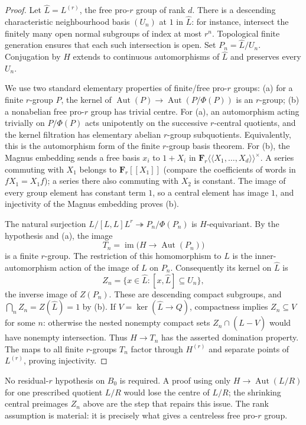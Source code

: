 \begin{proof}
Let $\widehat L=L^{(r)}$, the free pro-$r$ group of rank $d$.
There is a descending characteristic neighbourhood basis $(U_n)$ at $1$
in $\widehat L$: for instance, intersect the finitely many open normal
subgroups of index at most $r^n$. Topological finite generation ensures
that each such intersection is open. Set $P_n=\widehat L/U_n$.
Conjugation by $H$ extends to continuous automorphisms of $\widehat L$
and preserves every $U_n$.

We use two standard elementary properties of finite/free pro-$r$ groups:
(a) for a finite $r$-group $P$, the kernel of
$\operatorname{Aut}(P)\to\operatorname{Aut}(P/\Phi(P))$ is an $r$-group;
(b) a nonabelian free pro-$r$ group has trivial centre.
For (a), an automorphism acting trivially on $P/\Phi(P)$ acts unipotently
on the successive $r$-central quotients, and the kernel filtration has
elementary abelian $r$-group subquotients. Equivalently, this is the
automorphism form of the finite $r$-group basis theorem.
For (b), the Magnus embedding sends a free basis $x_i$ to $1+X_i$ in
$\mathbf F_r\langle\!\langle X_1,\ldots,X_d\rangle\!\rangle^\times$.
A series commuting with $X_1$ belongs to $\mathbf F_r[[X_1]]$ (compare
the coefficients of words in $fX_1=X_1f$); a series there also commuting
with $X_2$ is constant. The image of every group element has constant
term $1$, so a central element has image $1$, and injectivity of the
Magnus embedding proves (b).

The natural surjection
$L/[L,L]L^r\twoheadrightarrow P_n/\Phi(P_n)$ is $H$-equivariant.
By the hypothesis and (a), the image
\[
 T_n=\operatorname{im}\bigl(H\longrightarrow\operatorname{Aut}(P_n)\bigr)
\]
is a finite $r$-group. The restriction of this homomorphism to $L$
is the inner-automorphism action of the image of $L$ on $P_n$.
Consequently its kernel on $\widehat L$ is
\[
 Z_n=\{x\in\widehat L:[x,\widehat L]\subseteq U_n\},
\]
the inverse image of $Z(P_n)$. These are descending compact subgroups,
and $\bigcap_n Z_n=Z(\widehat L)=1$ by (b). If
$V=\ker(\widehat L\to Q)$, compactness implies $Z_n\subseteq V$ for some
$n$: otherwise the nested nonempty compact sets
$Z_n\cap(\widehat L-V)$ would have nonempty intersection.
Thus $H\to T_n$ has the asserted domination property.
The maps to all finite $r$-groups $T_n$ factor through $H^{(r)}$ and
separate points of $L^{(r)}$, proving injectivity.
\end{proof}

\begin{remark}
No residual-$r$ hypothesis on $B_0$ is required. A proof using only
$H\to\operatorname{Aut}(L/R)$ for one prescribed quotient $L/R$ would
lose the centre of $L/R$; the shrinking central preimages $Z_n$ above
are the step that repairs this issue. The rank assumption is material:
it is precisely what gives a centreless free pro-$r$ group.
\end{remark}

